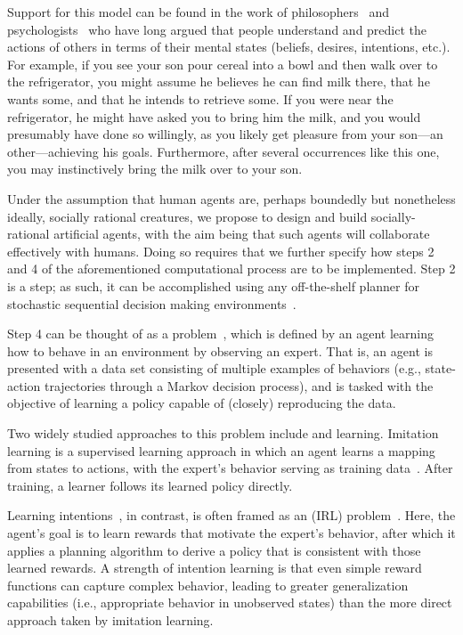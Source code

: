 Support for this model can be found in the work of
philosophers~\cite{dennett87} and psychologists~\cite{heider44} who
have long argued that people understand and predict the actions of
others in terms of their  mental states (beliefs, desires, intentions,
etc.).  For example, if you see your son pour cereal into a bowl and
then walk over to the refrigerator, you might assume he believes he can find milk there,
that he wants some, and that he intends to retrieve some.  If you were near the refrigerator, he
might have asked you to bring him the milk, and you would presumably
have done so willingly, as you likely get pleasure from your son---an
other---achieving his goals.  Furthermore, after several occurrences
like this one, you may instinctively bring the milk over to your son.

Under the assumption that human agents are, perhaps boundedly but
nonetheless ideally, socially rational creatures, we propose to design
and build socially-rational artificial agents, with the aim being that
such agents will collaborate effectively with humans.  Doing so
requires that we further specify how steps 2 and 4 of the
aforementioned computational process are to be implemented.  Step 2 is
a  step; as such, it can be accomplished using any
off-the-shelf planner for stochastic sequential decision making
environments~\cite{Barto95,bellman57,boutilier99,collins95,kearns99b,kocsis06}.

Step 4 can be thought of as a 
problem~\cite{argall09}, which is defined by an agent learning how to
behave in an environment by observing an expert.  That is, an agent is
presented with a data set consisting of multiple examples of behaviors
(e.g., state-action trajectories through a Markov decision process),
and is tasked with the objective of learning a policy capable of
(closely) reproducing the data.

Two widely studied approaches to this problem include
 and  learning.  Imitation learning
is a supervised learning approach in which an agent learns a mapping
from states to actions, with the expert's behavior serving as training
data~\cite{pomerleau93}.  After training, a learner follows its
learned policy directly.

Learning intentions~\cite{macglashan15b}, in contrast, is often framed
as an  (IRL)
problem~\cite{ng00,babes11}.  Here, the agent's goal is to learn
rewards that motivate the expert's behavior, after which it applies a
planning algorithm to derive a policy that is consistent with those
learned rewards.  A strength of intention learning is that even simple
reward functions can capture complex behavior, leading to greater
generalization capabilities (i.e., appropriate behavior in unobserved
states) than the more direct approach taken by imitation learning.

